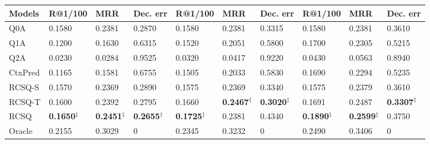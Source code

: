 \documentclass[format=acmsmall, review=False, screen=true]{acmart}
\begin{document}
\begin{table}[t]
{\begin{tabular}{l|l|l|l|l|l|l|l|l|l}
Models  & R@1/100     & MRR    & Dec. err    & R@1/100     & MRR    & Dec. err    & R@1/100     & MRR    & Dec. err  \\ \hline
Q0A     & 0.1580    & 0.2381    & 0.2870    & 0.1580    & 0.2381    & 0.3315    &  0.1580    & 0.2381    & 0.3610     \\ 
Q1A     & 0.1200    & 0.1630    & 0.6315    & 0.1520    & 0.2051   &  0.5800  & 0.1700    & 0.2305    & 0.5215   \\ 
Q2A     & 0.0230   & 0.0284  & 0.9525  & 0.0320  & 0.0417  & 0.9220  &  0.0430 & 0.0563  & 0.8940     \\ 
CtxPred & 0.1165  & 0.1581  & 0.6755  & 0.1505   & 0.2033   & 0.5830 & 0.1690    & 0.2294 & 0.5235       \\ \hline
RCSQ-S    & 0.1570   & 0.2369   & 0.2890 & 0.1575  & 0.2369 & 0.3340 & 0.1575 & 0.2379 & 0.3610 \\ 
RCSQ-T    &  0.1600   & 0.2392 & 0.2795   & 0.1660  & \textbf{0.2467}$^{\ddag}$  & \textbf{0.3020}$^{\ddag}$& 0.1691 & 0.2487  & \textbf{0.3307}$^{\ddag}$   \\
RCSQ    &  \textbf{0.1650}$^{\ddag}$   & \textbf{0.2451}$^{\ddag}$   & \textbf{0.2655}$^{\ddag}$  &  \textbf{0.1725}$^{\ddag}$ &  0.2381 &  0.4340 & \textbf{0.1890}$^{\ddag}$   & \textbf{0.2599}$^{\ddag}$  & 0.3750\\ \hline
Oracle  & 0.2155    & 0.3029    & 0  &   0.2345  &   0.3232     & 0    & 0.2490   & 0.3406 & 0   \\ 

\hline\hline
\end{tabular}
}
\label{udcpoly}
\end{table}
\end{document}
